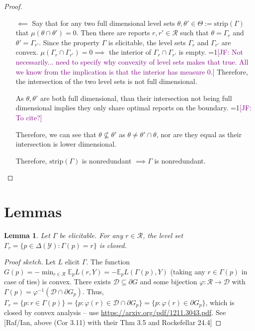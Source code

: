 \documentclass[12pt]{article}
\newcommand{\Comments}{1}
\newcommand{\mynote}[2]{\ifnum\Comments=1\textcolor{#1}{#2}\fi}
\newcommand{\jessie}[1]{\mynote{purple}{[JF: #1]}}
\newcommand{\D}{\mathcal{D}}
\newcommand{\E}{\mathbb{E}}
\newcommand{\R}{\mathcal{R}}
\newcommand{\Y}{\mathcal{Y}}
\newcommand{\strip}{\text{strip}}
\newtheorem{lemma}{Lemma}
\begin{document}
\begin{proof}
\begin{enumerate}
		
		\item[$\impliedby$] 
		Say that for any two full dimensional level sets $\theta, \theta' \in \Theta := \strip(\Gamma)$ that $\mu(\theta \cap \theta') = 0$.
		Then there are reports $r, r' \in \R$ such that $\theta = \Gamma_r$ and $\theta' = \Gamma_{r'}$.
		Since the property $\Gamma$ is elicitable, the level sets $\Gamma_r$ and $\Gamma_{r'}$ are convex.
		$\mu(\Gamma_r \cap \Gamma_{r'}) = 0 \implies$ the interior of $\Gamma_r \cap \Gamma_{r'}$ is empty.
		\jessie{Not necessarily... need to specify why convexity of level sets makes that true.
		All we know from the implication is that the interior has measure 0.}
		Therefore, the intersection of the two level sets is not full dimensional.
		
		As $\theta, \theta'$ are both full dimensional, than their intersection not being full dimensional implies they only share optimal reports on the boundary. \jessie{To cite?}
		
		Therefore, we can see that $\theta \not \subseteq \theta'$ as $\theta \neq \theta' \cap \theta$, nor are they equal as their intersection is lower dimensional.
		
		Therefore, $\strip(\Gamma)$ is nonredundant $\implies \Gamma$ is nonredundant.
	\end{enumerate}
	
\end{proof}


\section{Lemmas}

\begin{lemma}\label{lem:closed-level-sets}
	Let $\Gamma$ be elicitable.
	For any $r\in\R$, the level set $\Gamma_r = \{ p \in \Delta(\Y) : \Gamma(p) = r \}$ is closed.
\end{lemma}
\begin{proof}[Proof sketch]
	Let $L$ elicit $\Gamma$.
	The function $G(p) = -\min_{r\in\R} \E_p L(r,Y) = -\E_p L(\Gamma(p),Y)$ (taking any $r\in\Gamma(p)$ in case of ties) is convex.
	There exists $\D \subseteq \partial G$ and some bijection $\varphi : \R \to \D$ with $\Gamma(p) = \varphi^{-1}(\D\cap \partial G_p)$.
	Thus, $\Gamma_r = \{p : r\in\Gamma(p)\} = \{p : \varphi(r) \in \D\cap\partial G_p\} = \{p : \varphi(r) \in \partial G_p\}$, which is closed by convex analysis -- use \url{https://arxiv.org/pdf/1211.3043.pdf}.
	See [Raf/Ian, above (Cor 3.11) with their Thm 3.5 and Rockefellar 24.4]  
\end{proof}
\end{document}
